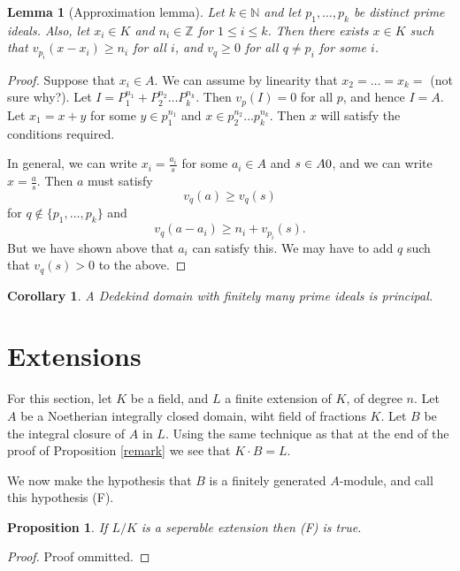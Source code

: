 \documentclass[11pt]{article} %
\newtheorem{cor}{Corollary}
\newtheorem{lem}{Lemma}
\newtheorem{prop}{Proposition}
\theoremstyle{remark}\newtheorem*{rem}{Remark}
\begin{document}
\begin{lem}[Approximation lemma]
 Let $k\in \mathbb N$ and let $p_1,\ldots , p_k$ be distinct prime ideals.
 Also, let $x_i\in K$ and $n_i\in \mathbb Z$ for $1\leq i \leq k$.
 Then there exists $x\in K$ such that $v_{p_i}(x-x_i)\geq n_i$ for all $i$, and $v_q \geq 0$ for all $q\neq p_i$ for some $i$.
\end{lem}
\begin{proof}
 Suppose that $x_i \in A$.
 We can assume by linearity that $x_2  = \ldots = x_k = $ (not sure why?).
 Let $I=P_1^{n_1} + P_2^{n_2}\ldots P_k^{n_k}$.
 Then $v_p(I)=0$ for all $p$, and hence $I=A$.
 Let $x_1 = x+ y$ for some $y\in p_1^{n_1}$ and $x\in p_2^{n_2}\ldots p_k^{n_k}$.
 Then $x$ will satisfy the conditions required.
 
 In general, we can write $x_i=\frac{a_i}{s}$ for some $a_i\in A$ and $s\in A\\{0}$, and we can write $x=\frac{a}{s}$.
 Then $a$ must satisfy 
 \[
  v_q(a) \geq v_q(s)
 \]
for $q\notin \{p_1,\ldots ,p_k\}$ and 
\[
 v_q(a-a_i) \geq n_i + v_{p_i}(s).
\]
But we have shown above that $a_i$ can satisfy this. We may have to add $q$ such that $v_q(s)>0$ to the above.
\end{proof}

\begin{cor}
 A Dedekind domain with finitely many prime ideals is principal.
\end{cor}

\section{Extensions}
For this section, let $K$ be a field, and $L$ a finite extension of $K$, of degree $n$.
Let $A$ be a Noetherian integrally closed domain, wiht field of fractions $K$.
Let $B$ be the integral closure of $A$ in $L$.
Using the same technique as that at the end of the proof of Proposition \ref{remark} we see that $K\cdot B = L$.

We now make the hypothesis that $B$ is a finitely generated $A$-module, and call this hypothesis (F).

\begin{prop}
 If $L/K$ is a seperable extension then (F) is true.
\end{prop}
\begin{proof}
 Proof ommitted.
\end{proof}
\end{document}
